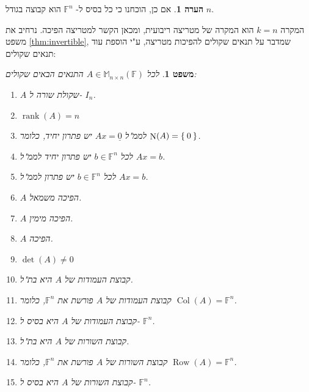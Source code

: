 \documentclass[12pt]{report}
\theoremstyle{plain}
\newtheorem{theorem}{משפט}[chapter]
\theoremstyle{definition}
\newtheorem{remark}{הערה}[chapter]
\newcommand{\F}{\mathbb{F}}
\DeclareMathOperator{\rank}{rank}
\newcommand{\M}{\mathbb{M}}
\newcommand{\0}{\mathbf{0}}
\DeclareMathOperator{\Row}{Row}
\DeclareMathOperator{\Col}{Col}
\DeclareMathOperator{\Null}{N}
\begin{document}
\begin{remark}
אם כן, הוכחנו כי כל בסיס ל-
$\F^n$
הוא קבוצה בגודל 
$n$.
\end{remark}

המקרה 
$k=n$
הוא המקרה של מטריצה ריבועית, ומכאן הקשר למטריצה הפיכה. נרחיב את משפט
\ref{thm:invertible},
שמדבר על תנאים שקולים להפיכות מטריצה, ע"י הוספת עוד תנאים שקולים:

\begin{theorem}\label{thm:invertible2}
לכל
$A\in\M_{n\times n}(\F)$
התנאים הבאים שקולים:
\begin{enumerate}[label=(\alph*)]
\item 
$A$
שקולת שורה ל-
$I_n$.


\item 
$\rank(A)=n$


\item 
לממ"ל
$Ax=\underline{0}$
יש פתרון יחיד, כלומר
$\Null(A)=\Set{0}$.


\item 
לכל
$b\in\F^n$
יש פתרון יחיד לממ"ל
$Ax=b$.


\item
לכל
$b\in\F^n$
יש פתרון לממ"ל
$Ax=b$.


\item 
$A$
הפיכה משמאל.


\item 
$A$
הפיכה מימין.


\item 
$A$
הפיכה.


\item 
$\det(A)\neq 0$


\item 
קבוצת העמודות של 
$A$
היא בת"ל.


\item 
קבוצת העמודות של 
$A$
פורשת את
$\F^n$,
כלומר
$\Col(A)=\F^n$.


\item 
קבוצת העמודות של 
$A$
היא בסיס ל-
$\F^n$.


\item 
קבוצת השורות של 
$A$
היא בת"ל.


\item 
קבוצת השורות של 
$A$
פורשת את
$\F^n$,
כלומר
$\Row(A)=\F^n$.


\item 
קבוצת השורות של 
$A$
היא בסיס ל-
$\F^n$.


\end{enumerate}
\end{theorem}
\end{document}
